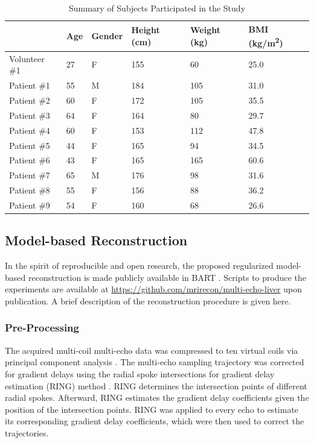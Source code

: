 \documentclass[journal,twoside,web]{ieeecolor}
\begin{document}
\begin{table}
	\caption{Summary of Subjects Participated in the Study}
	\label{TAB:Subject}
	\setlength{\tabcolsep}{3pt}
	\begin{tabular}{m{} m{} m{} m{} m{} m{}}
		\toprule
		& Age & Gender & Height (\si{\centi\meter}) & Weight (\si{\kilogram}) & BMI (\si{\kilogram/\square\meter}) \\
		\hline
		Volunteer \#1 & 27 & F & 155 &  60 & 25.0 \\
		Patient \#1   & 55 & M & 184 & 105 & 31.0 \\ %
		Patient \#2   & 60 & F & 172 & 105 & 35.5 \\ %
		Patient \#3   & 64 & F & 164 &  80 & 29.7 \\ %
		Patient \#4   & 60 & F & 153 & 112 & 47.8 \\ %
		Patient \#5   & 44 & F & 165 &  94 & 34.5 \\ %
		Patient \#6   & 43 & F & 165 & 165 & 60.6 \\ %
		Patient \#7   & 65 & M & 176 &  98 & 31.6 \\ %
		Patient \#8   & 55 & F & 156 &  88 & 36.2 \\ %
		Patient \#9   & 54 & F & 160 &  68 & 26.6 \\ %
		\bottomrule
	\end{tabular}
\end{table}


\subsection{Model-based Reconstruction}

In the spirit of reproducible and open research, 
the proposed regularized model-based reconstruction is made
publicly available in BART \cite{uecker_2015_bart}. 
Scripts to produce the experiments are available at \url{https://github.com/mrirecon/multi-echo-liver} upon publication. 
A brief description of the reconstruction procedure is given here.

\subsubsection*{Pre-Processing}

The acquired multi-coil multi-echo data was compressed to ten virtual coils 
via principal component analysis \cite{huang_2008_scc}. 
The multi-echo sampling trajectory 
was corrected for gradient delays using the
radial spoke intersections for gradient delay estimation (RING) method 
\cite{rosenzweig_2019_ring}. 
RING determines the intersection points of different radial spokes. 
Afterward, RING estimates the gradient delay coefficients 
given the position of the intersection points. 
RING was applied to every echo to estimate 
its corresponding gradient delay coefficients, 
which were then used to correct the trajectories.
\end{document}
